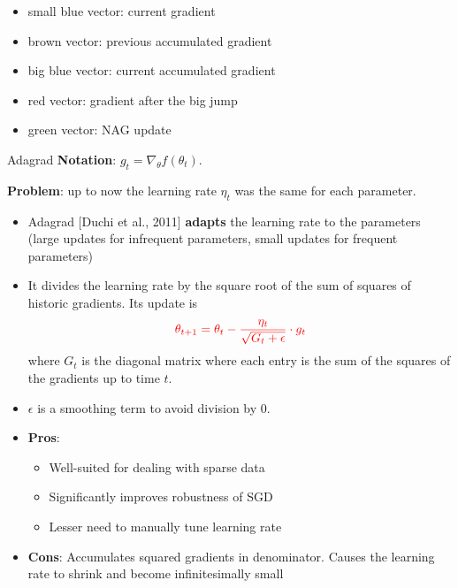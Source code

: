 \documentclass[english]{article}
\begin{document}
\begin{itemize}
\item small blue vector: current gradient
\item brown vector: previous accumulated gradient
\item big blue vector: current accumulated gradient
\item red vector: gradient after the big jump
\item green vector: NAG update
\end{itemize}






\item {Adagrad}
\textbf{Notation}: $g_t = \nabla_\theta f(\theta_t)$.


\textbf{Problem}: up to now the learning rate $\eta_t$ was the same for each parameter.


\begin{itemize}
\item Adagrad [Duchi et al., 2011] \textbf{adapts} the learning rate to the parameters (large updates for infrequent parameters, small updates for frequent parameters)
\item It divides the learning rate by the square root of the sum of squares of historic gradients. Its update is
$$\textcolor{red}{\theta_{t+1} = \theta_t - \frac{\eta_t}{\sqrt{G_t + \epsilon}} \cdot g_t}$$
where $G_t$ is the diagonal matrix where each entry is the sum of the squares of the gradients up to time $t$.
\item $\epsilon$ is a smoothing term to avoid division by $0$.
\end{itemize}









\begin{itemize}
\item \textbf{Pros}:
\begin{itemize}
\item Well-suited for dealing with sparse data 
\item Significantly improves robustness of SGD
\item Lesser need to manually tune learning rate
\end{itemize}

\item \textbf{Cons}: Accumulates squared gradients in denominator. Causes the learning rate to shrink and become infinitesimally small
\end{itemize}
\end{document}
